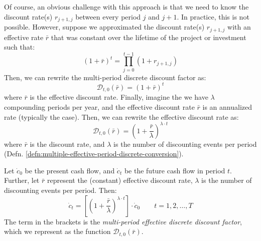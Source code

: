 \documentclass[11pt]{article}
\theoremstyle{definition}
\begin{document}
Of course, an obvious challenge with this approach is that we need to know the discount rate(s) $r_{j+1,j}$ between every period $j$ and $j+1$.
In practice, this is not possible. However, suppose we  approximated the discount rate(s) $r_{j+1,j}$ with an effective rate $\bar{r}$ 
that was constant over the lifetime of the project or investment such that:
\begin{equation}\label{eq:effective-rate}
\left(1+\bar{r}\right)^{t} = \prod_{j=0}^{t-1}\left(1+r_{j+1,j}\right)
\end{equation}
Then, we can rewrite the multi-period discrete discount factor as:
\begin{equation}\label{eq:multi-period-discrete-discount-factor}
\mathcal{D}_{t,0}(\bar{r}) = \left(1+\bar{r}\right)^{t}
\end{equation}
where $\bar{r}$ is the effective discount rate. Finally, imagine the we have $\lambda$ compounding periods per year, 
and the effective discount rate $\bar{r}$ is an annualized rate (typically the case). 
Then, we can rewrite the effective discount rate as:
\begin{equation}\label{eq:effective-rate-compounded}
\mathcal{D}_{t,0}(\bar{r}) = \left(1+\frac{\bar{r}}{\lambda}\right)^{\lambda\cdot{t}}
\end{equation}
where $\bar{r}$ is the discount rate, and $\lambda$ is the number of discounting events per period
(Defn. \ref{defn:multiple-effective-period-discrete-conversion}).
\begin{definition}\label{defn:multiple-effective-period-discrete-conversion}
	Let $\dot{c}_0$ be the present cash flow, and $\dot{c}_t$ be the future cash flow in period $t$. 
	Further, let $\bar{r}$ represent the (constant) effective discount rate, $\lambda$ is the number of discounting events per period. 
	Then:
	\begin{equation}
	\dot{c}_{t} = \left[\left(1+\frac{\bar{r}}{\lambda}\right)^{\lambda\cdot{t}}\right]\cdot\dot{c}_{0}\qquad{t=1,2,\dots,T}
	\end{equation}
	The term in the brackets is the \textit{multi-period effective discrete discount factor}, which we represent as the function $\mathcal{D}_{t,0}(\bar{r})$.
\end{definition}
\end{document}
